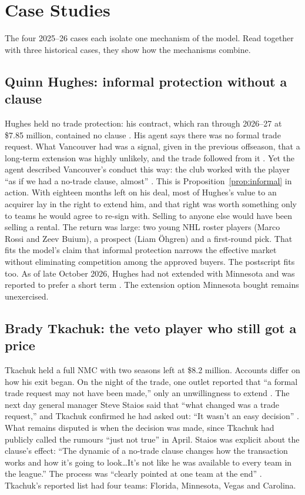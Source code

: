 \section{Case Studies}\label{sec:cases}

The four 2025--26 cases each isolate one mechanism of the model. Read together with three historical cases, they show how the mechanisms combine.

\subsection{Quinn Hughes: informal protection without a clause}

Hughes held no trade protection: his contract, which ran through 2026--27 at \$7.85 million, contained no clause \citep{cbs_hughes}. His agent says there was no formal trade request. What Vancouver had was a signal, given in the previous offseason, that a long-term extension was highly unlikely, and the trade followed from it \citep{espn_hughes}. Yet the agent described Vancouver's conduct this way: the club worked with the player ``as if we had a no-trade clause, almost'' \citep{dailyhive_hughes}. This is Proposition~\ref{prop:informal} in action. With eighteen months left on his deal, most of Hughes's value to an acquirer lay in the right to extend him, and that right was worth something only to teams he would agree to re-sign with. Selling to anyone else would have been selling a rental. The return was large: two young NHL roster players (Marco Rossi and Zeev Buium), a prospect (Liam \"Ohgren) and a first-round pick. That fits the model's claim that informal protection narrows the effective market without eliminating competition among the approved buyers. The postscript fits too. As of late October 2026, Hughes had not extended with Minnesota and was reported to prefer a short term \citep{rmnb_hughes}. The extension option Minnesota bought remains unexercised.

\subsection{Brady Tkachuk: the veto player who still got a price}

Tkachuk held a full NMC with two seasons left at \$8.2 million. Accounts differ on how his exit began. On the night of the trade, one outlet reported that ``a formal trade request may not have been made,'' only an unwillingness to extend \citep{fourthperiod_tkachuk}. The next day general manager Steve Staios said that ``what changed was a trade request,'' and Tkachuk confirmed he had asked out: ``It wasn't an easy decision'' \citep{yahoo_staios,thescore_tkachuk}. What remains disputed is when the decision was made, since Tkachuk had publicly called the rumours ``just not true'' in April. Staios was explicit about the clause's effect: ``The dynamic of a no-trade clause changes how the transaction works and how it's going to look\ldots It's not like he was available to every team in the league.'' The process was ``clearly pointed at one team at the end'' \citep{yahoo_staios,tsn_staios}. Tkachuk's reported list had four teams: Florida, Minnesota, Vegas and Carolina.

